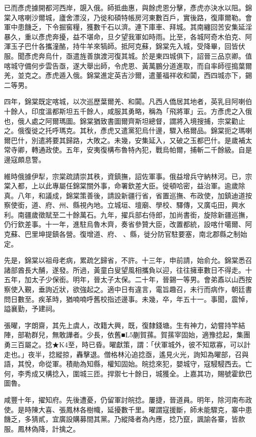 \begin{pinyinscope}
已而彥虎據開都河西岸，覬入俄。師抵曲惠，與餘虎恩分擊，彥虎亦決水以阻。錦棠入喀喇沙爾城，廬舍漂沒，乃徙和碩特帳房河東數百戶，實後路，復庫爾勒。會軍中患饑乏，下令掘窖糧，獲數千石以濟。連下庫車、拜城。其南纏回苦安集延淫暴久，重以彥虎奔擾，益不堪命，旦夕望我軍如時雨。比至，各城阿奇木伯克、阿渾玉子巴什各攜潼酪，持牛羊來犒師。抵阿克蘇，錦棠先入城，受降畢，回皆伏服。聞彥虎奔烏什，亟遣旌善旗渡河復其城。於是東四城俱下，詔晉三品京卿。值喀城守備何步雲告亟，遂大舉出師，令虎恩、黃萬鵬分道進取，而自率師徑搗葉爾羌，並克之。彥虎遁入俄。錦棠進定英吉沙爾，遣董福祥收和闐，西四城亦下，錫二等男。

四年，錦棠既定喀城，以次巡歷葉爾羌、和闐。凡西人僑居其地者，英乳目阿喇伯十餘人，印度溫都斯坦五千餘人，咸服其勇略，稱為「飛將軍」云。方彥虎之入俄也，俄人處之阿爾瑪圖。錦棠猶致書圖爾齊斯坦總督，謂將入境搜捕，宗棠勸止之。俄復徙之托呼瑪克。其秋，彥虎又遣黨犯烏什邊，驟入格爾品。錦棠扼之瑪喇爾巴什，別遣將要其歸路，大敗之。未幾，安集延入，又破之玉都巴什。是歲補太常寺卿，轉通政使。五年，安夷復構布魯特內犯，戰烏帕爾，捕斬二千餘級。自是邊寇頗息警。

維時俄據伊犁，宗棠疏請崇其秩，資鎮撫，詔佐軍事。俄益增兵守納林河。已，宗棠入都，上以此專屬任錦棠關外事，命署欽差大臣。徙頓哈密，益治軍。逾歲除真。八年，和議成，錦棠策善後，請設新疆行省，省置巡撫、布政使，加鎮迪道按察使銜，道、府、州、縣視內地。立城垣、壇廟、學校、驛傳，又廣屯田，興水利。南疆歲徵賦至二十餘萬石。九年，擢兵部右侍郎，加尚書銜，旋除新疆巡撫，仍行欽差事。十一年，進駐烏魯木齊，奏省參贊大臣，改置都統，設喀什噶爾、阿克蘇、巴里坤提鎮各營。復增道、府、、縣，徙分防官駐要塞，南北郡縣之制始定。

先是，錦棠以祖母老病，累疏乞歸省，不許。十三年，申前請，始俞允。錦棠悉召諸部酋長大酺，遂發。所過，黃童白叟望風相攜負以迎，往往擁車數日不得走。十五年，加太子少保銜。明年，晉太子太保。二十年，晉錫一等男。會弟鼒以山西按察使入覲，垂詢近狀，欲強起之。適中日有違言，電旨趣召，未行而病作，朝廷書問日數至。疾革時，猶喃喃呼舊校指述邊事。未幾，卒，年五十一。事聞，震悼，謚襄勤，予建祠。

張曜，字朗齋，其先上虞人，改籍大興，既，復隸錢塘。生有神力，幼嘗持竿結陣，部勒群兒，無敢譁者。少長，依舊■L5蒯賀蓀。賀蓀宰固始，適豫捻起，集團勇三百屬之。捻★K4至，時已昏。曜獻策，謂：「伏軍城外，彼不知眾寡，可以計走也。」夜半，捻縱掠，轟擊退。僧格林沁追捻亟，遙見火光，詢知為曜部，召與語，其悅，命從軍。積勛為知縣，權知固始。皖捻來犯，嬰城守，寇駸駸西去。亡何，李秀成又構捻入，圍城三匝。捍禦七十餘日，城獲全。上嘉其功，賜號霍欽巴圖魯。

咸豐十年，擢知府。先後遭憂，仍留軍討皖捻。屢捷，晉道員。明年，除河南布政使。是時陳大喜、張鳳林各樹幟，延擾數千里。曜謂寇援斷，師未能驟克，寨中患饑乏，多猜貳，宜廣設購募間其黨。乃縱降者為內應，捻乃竄，諷諭各寨，皆款服。鳳林偽降，計擒之。


\end{pinyinscope}
